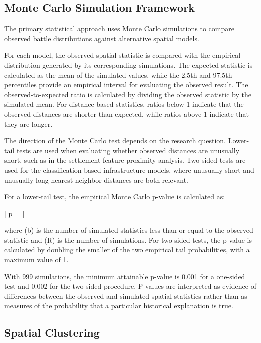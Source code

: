 \documentclass[
  letterpaper,
  DIV=11,
  numbers=noendperiod]{scrartcl}
\begin{document}
\subsection{Monte Carlo Simulation
Framework}\label{monte-carlo-simulation-framework}

The primary statistical approach uses Monte Carlo simulations to compare
observed battle distributions against alternative spatial models.

For each model, the observed spatial statistic is compared with the
empirical distribution generated by its corresponding simulations. The
expected statistic is calculated as the mean of the simulated values,
while the 2.5th and 97.5th percentiles provide an empirical interval for
evaluating the observed result. The observed-to-expected ratio is
calculated by dividing the observed statistic by the simulated mean. For
distance-based statistics, ratios below 1 indicate that the observed
distances are shorter than expected, while ratios above 1 indicate that
they are longer.

The direction of the Monte Carlo test depends on the research question.
Lower-tail tests are used when evaluating whether observed distances are
unusually short, such as in the settlement-feature proximity analysis.
Two-sided tests are used for the classification-based infrastructure
models, where unusually short and unusually long nearest-neighbor
distances are both relevant.

For a lower-tail test, the empirical Monte Carlo p-value is calculated
as:

{[} p =  {]}

where (b) is the number of simulated statistics less than or equal to
the observed statistic and (R) is the number of simulations. For
two-sided tests, the p-value is calculated by doubling the smaller of
the two empirical tail probabilities, with a maximum value of 1.

With 999 simulations, the minimum attainable p-value is 0.001 for a
one-sided test and 0.002 for the two-sided procedure. P-values are
interpreted as evidence of differences between the observed and
simulated spatial statistics rather than as measures of the probability
that a particular historical explanation is true.

\subsection{Spatial Clustering}\label{spatial-clustering}
\end{document}
